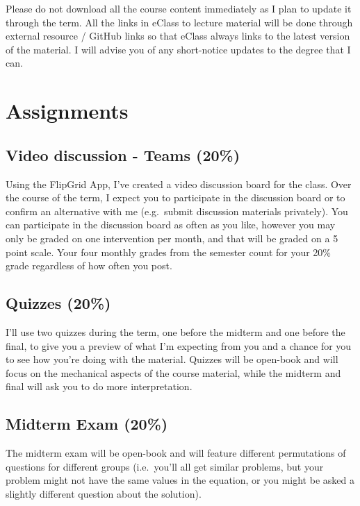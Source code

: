 \documentclass[11pt,]{article}
\begin{document}
Please do not download all the course content immediately as I plan to
update it through the term. All the links in eClass to lecture material
will be done through external resource / GitHub links so that eClass
always links to the latest version of the material. I will advise you of
any short-notice updates to the degree that I can.

\hypertarget{course-material}{%
\section{Assignments}\label{course-material}}

\hypertarget{video-discussion---teams-20}{%
\subsection{Video discussion - Teams
(20\%)}\label{video-discussion---teams-20}}

Using the FlipGrid App, I've created a video discussion board for the
class. Over the course of the term, I expect you to participate in the
discussion board or to confirm an alternative with me (e.g.~submit
discussion materials privately). You can participate in the discussion
board as often as you like, however you may only be graded on one
intervention per month, and that will be graded on a 5 point scale. Your
four monthly grades from the semester count for your 20\% grade
regardless of how often you post.

\hypertarget{quizzes-20}{%
\subsection{Quizzes (20\%)}\label{quizzes-20}}

I'll use two quizzes during the term, one before the midterm and one
before the final, to give you a preview of what I'm expecting from you
and a chance for you to see how you're doing with the material. Quizzes
will be open-book and will focus on the mechanical aspects of the course
material, while the midterm and final will ask you to do more
interpretation.

\hypertarget{midterm-exam-20}{%
\subsection{Midterm Exam (20\%)}\label{midterm-exam-20}}

The midterm exam will be open-book and will feature different
permutations of questions for different groups (i.e.~you'll all get
similar problems, but your problem might not have the same values in the
equation, or you might be asked a slightly different question about the
solution).
\end{document}
